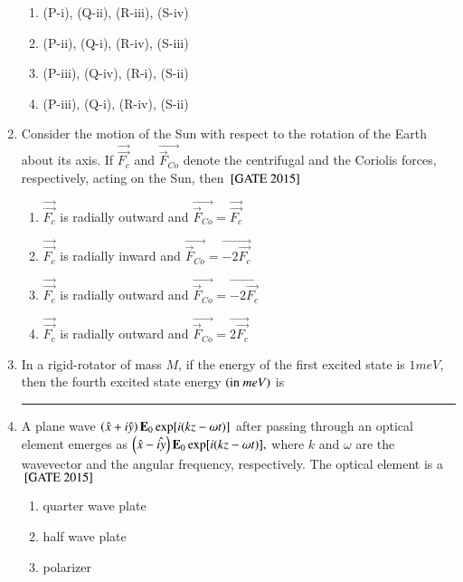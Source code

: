 \documentclass[journal]{IEEEtran}
\begin{document}
\begin{enumerate}
\begin{table}[ht]
\label{tab:matching_table}
\end{table}
\begin{multicols}{2}
\begin{enumerate}
\item  (P-i), (Q-ii), (R-iii), (S-iv)
\item  (P-ii), (Q-i), (R-iv), (S-iii)
\item  (P-iii), (Q-iv), (R-i), (S-ii)
\item  (P-iii), (Q-i), (R-iv), (S-ii)
\end{enumerate}
\end{multicols}
\item Consider the motion of the Sun with respect to the rotation of the Earth about its axis. If $\vec{\overrightarrow{F_c}}$ and $\vec{\overrightarrow{F}{_{Co}}}$ denote the centrifugal and the Coriolis forces, respectively, acting on the Sun, then \hfill{${}\left[\text{GATE 2015}\right]$} 
\begin{enumerate}
    \item $\vec{\overrightarrow{F_c}}$ is radially outward and $\vec{\overrightarrow{F}{_{Co}}} = \vec{\overrightarrow{F_c}}$
        \item $\vec{\overrightarrow{F_c}}$ is radially inward and $\vec{\overrightarrow{F}{_{Co}}} = \vec{-2\overrightarrow{F_c}}$
         \item $\vec{\overrightarrow{F_c}}$ is radially outward and $\vec{\overrightarrow{F}{_{Co}}} = \vec{-2\overrightarrow{F_c}}$
          \item $\vec{\overrightarrow{F_c}}$ is radially outward and $\vec{\overrightarrow{F}{_{Co}}} = \vec{2\overrightarrow{F_c}}$
\end{enumerate}
\item In a rigid-rotator of mass $M$, if the energy of the first excited state is $1 meV$, then the fourth excited state energy $\left(\text{in } meV\right)$ is \rule{1.7cm}{0.2mm}
\item A plane wave $\left(\hat{x} + i\hat{y}\right)\mathbf{E}_0 \exp[i(kz - \omega t)]$  after passing through an optical element emerges as $\left(\hat{x} - \hat{iy}\right)\mathbf{E}_0 \exp[i(kz - \omega t)],$ where  $k$ and  $\omega$ are the wavevector and the angular frequency, respectively. The optical element is a \hfill{${}\left[\text{GATE 2015}\right]$} 
\begin{multicols}{2}
\begin{enumerate}
    \item quarter wave plate
    \item half wave plate
    \item polarizer

\end{enumerate}
\end{multicols}
\end{enumerate}
\end{document}
